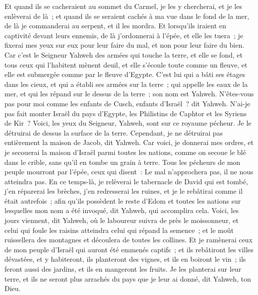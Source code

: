 \begin{multicols}{2}
Et quand ils se cacheraient au sommet du Carmel, je les y chercherai, et je les enlèverai de là~; et quand ils se seraient cachés à ma vue dans le fond de la mer, de là je commanderai au serpent, et il les mordra.
Et lorsqu'ils iraient en captivité devant leurs ennemis, de là j'ordonnerai à l'épée, et elle les tuera~; je fixerai mes yeux sur eux pour leur faire du mal, et non pour leur faire du bien.
Car c'est le Seigneur Yahweh des armées qui touche la terre, et elle se fond, et tous ceux qui l'habitent mènent deuil, et elle s'écoule toute comme un fleuve, et elle est submergée comme par le fleuve d'Egypte. 
C'est lui qui a bâti ses étages dans les cieux, et qui a établi ses armées sur la terre~; qui appelle les eaux de la mer, et qui les répand sur le dessus de la terre~; son nom est Yahweh. 
N'êtes-vous pas pour moi comme les enfants de Cusch, enfants d'Israël~? dit Yahweh. N'ai-je pas fait monter Israël du pays d'Egypte, les Philistins de Caphtor et les Syriens de Kir~?
Voici, les yeux du Seigneur, Yahweh, sont sur ce royaume pécheur. Je le détruirai de dessus la surface de la terre. Cependant, je ne détruirai pas entièrement la maison de Jacob, dit Yahweh.
Car voici, je donnerai mes ordres, et je secouerai la maison d'Israël parmi toutes les nations, comme on secoue le blé dans le crible, sans qu'il en tombe un grain à terre.
Tous les pécheurs de mon peuple mourront par l'épée, ceux qui disent~: Le mal n'approchera pas, il ne nous atteindra pas.
En ce temps-là, je relèverai le tabernacle de David qui est tombé, j'en réparerai les brèches, j'en redresserai les ruines, et je le rebâtirai comme il était autrefois~;
afin qu'ils possèdent le reste d'Edom et toutes les nations sur lesquelles mon nom a été invoqué, dit Yahweh, qui accomplira cela.
Voici, les jours viennent, dit Yahweh, où le laboureur suivra de près le moissonneur, et celui qui foule les raisins atteindra celui qui répand la semence~; et le moût ruissellera des montagnes et découlera de toutes les collines.
Et je ramènerai ceux de mon peuple d'Israël qui auront été emmenés captifs~; et ils rebâtiront les villes dévastées, et y habiteront, ils planteront des vignes, et ils en boiront le vin~; ils feront aussi des jardins, et ils en mangeront les fruits.
Je les planterai sur leur terre, et ils ne seront plus arrachés du pays que je leur ai donné, dit Yahweh, ton Dieu.
\PPE{}
\end{multicols}
